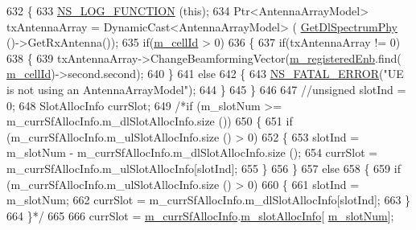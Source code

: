 \begin{DoxyCode}
632 \{
633           \hyperlink{log-macros-disabled_8h_a90b90d5bad1f39cb1b64923ea94c0761}{NS\_LOG\_FUNCTION} (\textcolor{keyword}{this});
634         Ptr<AntennaArrayModel> txAntennaArray = DynamicCast<AntennaArrayModel> (
      \hyperlink{classns3_1_1MmWaveUePhy_ae2a7d8583554822543d5b62a02e7c8db}{GetDlSpectrumPhy} ()->GetRxAntenna());
635         \textcolor{keywordflow}{if}(\hyperlink{classns3_1_1MmWavePhy_a0594531da45f93220d4f5de292bae823}{m\_cellId} > 0)
636         \{
637                 \textcolor{keywordflow}{if}(txAntennaArray != 0)
638                 \{
639                         txAntennaArray->ChangeBeamformingVector(\hyperlink{classns3_1_1MmWaveUePhy_a30d6221ea89c1d9fdc74b88da0b8360f}{m\_registeredEnb}.find(
      \hyperlink{classns3_1_1MmWavePhy_a0594531da45f93220d4f5de292bae823}{m\_cellId})->second.second);
640                 \}
641                 \textcolor{keywordflow}{else}
642                 \{
643                         \hyperlink{group__fatal_ga5131d5e3f75d7d4cbfd706ac456fdc85}{NS\_FATAL\_ERROR}(\textcolor{stringliteral}{"UE is not using an AntennaArrayModel"});
644                 \}
645         \}
646 
647         \textcolor{comment}{//unsigned slotInd = 0;}
648         SlotAllocInfo currSlot;
649         \textcolor{comment}{/*if (m\_slotNum >= m\_currSfAllocInfo.m\_dlSlotAllocInfo.size ())}
650 \textcolor{comment}{        \{}
651 \textcolor{comment}{                if (m\_currSfAllocInfo.m\_ulSlotAllocInfo.size () > 0)}
652 \textcolor{comment}{                \{}
653 \textcolor{comment}{                        slotInd = m\_slotNum - m\_currSfAllocInfo.m\_dlSlotAllocInfo.size ();}
654 \textcolor{comment}{                        currSlot = m\_currSfAllocInfo.m\_ulSlotAllocInfo[slotInd];}
655 \textcolor{comment}{                \}}
656 \textcolor{comment}{        \}}
657 \textcolor{comment}{        else}
658 \textcolor{comment}{        \{}
659 \textcolor{comment}{                if (m\_currSfAllocInfo.m\_ulSlotAllocInfo.size () > 0)}
660 \textcolor{comment}{                \{}
661 \textcolor{comment}{                        slotInd = m\_slotNum;}
662 \textcolor{comment}{                        currSlot = m\_currSfAllocInfo.m\_dlSlotAllocInfo[slotInd];}
663 \textcolor{comment}{                \}}
664 \textcolor{comment}{        \}*/}
665 
666         currSlot = \hyperlink{classns3_1_1MmWaveUePhy_ac557b99a2b425df99cb8d827f939df90}{m\_currSfAllocInfo}.\hyperlink{structns3_1_1SfAllocInfo_a6a87109ff89bf270a74ff95a5bbf9231}{m\_slotAllocInfo}[
      \hyperlink{classns3_1_1MmWavePhy_a6c83cdb8c36a9a58ae8b9f17933680ac}{m\_slotNum}];

\end{DoxyCode}
